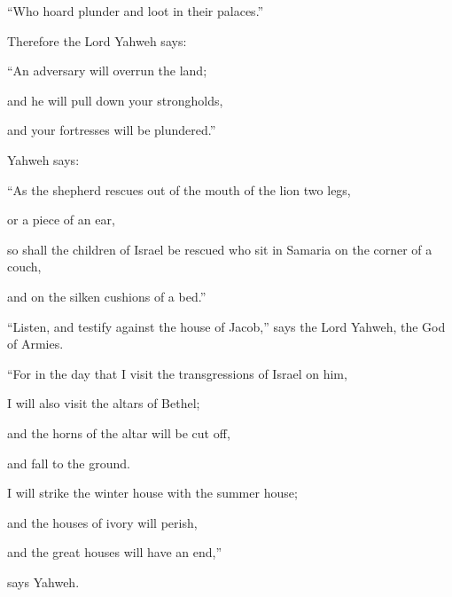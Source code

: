 {\par }{\QB “Who hoard plunder and loot in their palaces.”
\par }{\PP {}Therefore the Lord Yahweh says:
\par }{\Q “An adversary will overrun the land;
\par }{\QB and he will pull down your strongholds,
\par }{\QB and your fortresses will be plundered.”
\par }{\PP {}Yahweh says:
\par }{\Q “As the shepherd rescues out of the mouth of the lion two legs,
\par }{\QB or a piece of an ear,
\par }{\QB so shall the children of Israel be rescued who sit in Samaria on the corner of a couch,
\par }{\QB and on the silken cushions of a bed.”
\par }{\PP {}“Listen, and testify against the house of Jacob,” says the Lord Yahweh, the God of Armies.
\par }{\Q {}“For in the day that I visit the transgressions of Israel on him,
\par }{\QB I will also visit the altars of Bethel;
\par }{\QB and the horns of the altar will be cut off,
\par }{\QB and fall to the ground.
\par }{\Q {}I will strike the winter house with the summer house;
\par }{\QB and the houses of ivory will perish,
\par }{\QB and the great houses will have an end,”
\par }{\PP says Yahweh.

}
